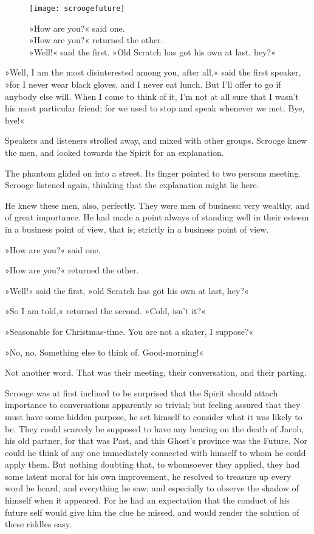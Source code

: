 \begin{figure}[p]
\centering
\texttt{[image: scroogefuture]}
\caption[\textbf{»Old Scratch has got his own at last, hey?«}]{»How are you?« said one.\\
»How are you?« returned the other.\\
»Well!« said the first. »Old Scratch has got his own at last, hey?«}
\end{figure}

»Well, I am the most disinterested among you, after all,« said the first speaker, »for I never wear black gloves, and I never eat lunch. But I'll offer to go if anybody else will. When I come to think of it, I'm not at all sure that I wasn't his most particular friend; for we used to stop and speak whenever we met. Bye, bye!«

Speakers and listeners strolled away, and mixed with other groups. Scrooge knew the men, and looked towards the Spirit for an explanation.

The phantom glided on into a street. Its finger pointed to two persons meeting. Scrooge listened again, thinking that the explanation might lie here.

He knew these men, also, perfectly. They were men of business: very wealthy, and of great importance. He had made a point always of standing well in their esteem in a business point of view, that is; strictly in a business point of view.

»How are you?« said one.

»How are you?« returned the other.

»Well!« said the first, »old Scratch has got his own at last, hey?«

»So I am told,« returned the second. »Cold, isn't it?«

»Seasonable for Christmas-time. You are not a skater, I suppose?«

»No, no. Something else to think of. Good-morning!«

Not another word. That was their meeting, their conversation, and their parting.

Scrooge was at first inclined to be surprised that the Spirit should attach importance to conversations apparently so trivial; but feeling assured that they must have some hidden purpose, he set himself to consider what it was likely to be. They could scarcely be supposed to have any bearing on the death of Jacob, his old partner, for that was Past, and this Ghost's province was the Future. Nor could he think of any one immediately connected with himself to whom he could apply them. But nothing doubting that, to whomsoever they applied, they had some latent moral for his own improvement, he resolved to treasure up every word he heard, and everything he saw; and especially to observe the shadow of himself when it appeared. For he had an expectation that the conduct of his future self would give him the clue he missed, and would render the solution of these riddles easy.


